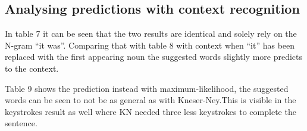 \subsection{Analysing predictions with context recognition}
In table 7 it can be seen that the two results are identical and solely rely on the N-gram “it was”. Comparing that with table 8 with context when “it” has been replaced with the first appearing noun the suggested words slightly more predicts to the context.

Table 9 shows the prediction instead with maximum-likelihood, the suggested words can be seen to not be as general as with Kneser-Ney.This is visible in the keystrokes result as well where KN needed three less keystrokes to complete the sentence.